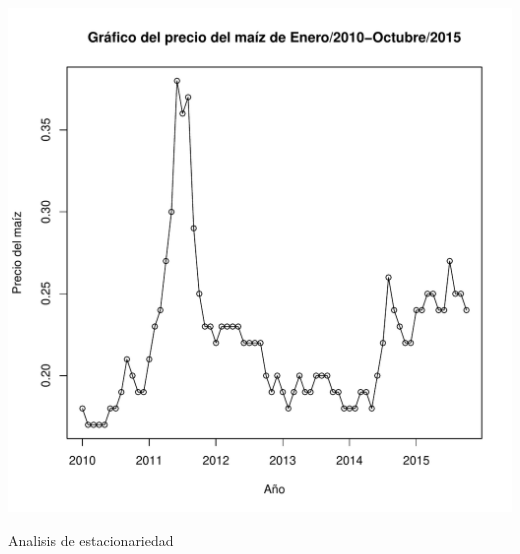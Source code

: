 \documentclass{article}\usepackage[]{graphicx}\usepackage[]{color}
\makeatletter
\def\maxwidth{ %
  \ifdim\Gin@nat@width>\linewidth
    \linewidth
  \else
    \Gin@nat@width
  \fi
}
\newenvironment{kframe}{%
 \def\at@end@of@kframe{}%
 \ifinner\ifhmode%
  \def\at@end@of@kframe{\end{minipage}}%
  \begin{minipage}{\columnwidth}%
 \fi\fi%
 \def\FrameCommand##1{\hskip\@totalleftmargin \hskip-\fboxsep
 \colorbox{shadecolor}{##1}\hskip-\fboxsep
     \hskip-\linewidth \hskip-\@totalleftmargin \hskip\columnwidth}%
 \MakeFramed {\advance\hsize-\width
   \@totalleftmargin\z@ \linewidth\hsize
   \@setminipage}}%
 {\par\unskip\endMakeFramed%
 \at@end@of@kframe}
\newenvironment{knitrout}{}{} %
\makeatother
\begin{document}
\begin{knitrout}
\begin{kframe}
\end{kframe}
\includegraphics[width=\maxwidth]{figure/unnamed-chunk-1-1} 

\end{knitrout}

Analisis de estacionariedad
\end{document}

